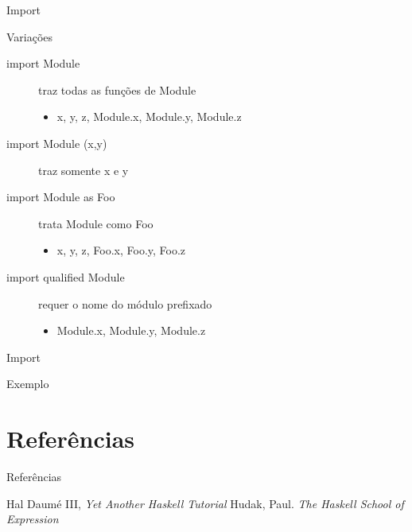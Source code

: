 \documentclass{beamer}
\begin{document}
			\begin{frame}[fragile]{Import}
			 \begin{block}{Variações}
			  \begin{description}
			   \item [import Module] traz todas as funções de Module
					\begin{itemize}
					 \item x, y, z, Module.x, Module.y, Module.z
					\end{itemize}
				 \item [import Module (x,y)] traz somente x e y
				 \item [import Module as Foo] trata Module como Foo
					\begin{itemize}
					 \item x, y, z, Foo.x, Foo.y, Foo.z
					\end{itemize}

			   \item [import qualified Module] requer o nome do módulo prefixado
					\begin{itemize}
					 \item Module.x, Module.y, Module.z
					\end{itemize}
			  \end{description}			  
			 \end{block}
			\end{frame}
			
			\begin{frame}[fragile]{Import}
			 \begin{block}{Exemplo}
			  
			 \end{block}
			\end{frame}
			
\section{Referências}
\begin{frame}{Referências}
	\begin{thebibliography}{9}
	 Hal Daumé III, \textit{Yet Another Haskell Tutorial}
	 Hudak, Paul. \textit{The Haskell School of Expression}
	\end{thebibliography}
\end{frame}
	
	
\end{document}
